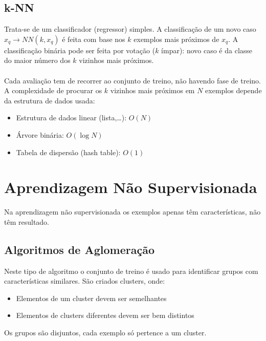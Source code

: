 \documentclass[10pt,a4paper]{report}
\begin{document}
\subsection{k-NN}
Trata-se de um classificador (regressor) simples. A classificação de um novo caso $x_q \rightarrow NN(k,x_q)$ é feita com base nos $k$ exemplos mais próximos de $x_q$. A classificação binária pode ser feita por votação ($k$ ímpar): novo caso é da classe do maior número dos $k$ vizinhos mais próximos.\\
\\
Cada avaliação tem de recorrer ao conjunto de treino, não havendo fase de treino. A complexidade de procurar os $k$ vizinhos mais próximos em $N$ exemplos depende da estrutura de dados usada:
\begin{itemize}
\item Estrutura de dados linear (lista,…): $O(N)$
\item Árvore binária: $O(\log N)$
\item Tabela de dispersão (hash table): $O(1)$
\end{itemize}
\section{Aprendizagem Não Supervisionada}
Na aprendizagem não supervisionada os exemplos apenas têm características, não têm resultado.
\subsection{Algoritmos de Aglomeração}
Neste tipo de algoritmo o conjunto de treino é usado para identificar grupos com características similares. São criados clusters, onde:
\begin{itemize}
\item Elementos de um cluster devem ser semelhantes
\item Elementos de clusters diferentes devem ser bem distintos
\end{itemize}
Os grupos são disjuntos, cada exemplo só pertence a um cluster.
\end{document}

